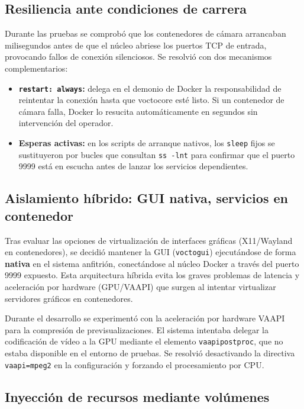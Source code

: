 \subsection{Resiliencia ante condiciones de carrera}

Durante las pruebas se comprobó que los contenedores de cámara arrancaban
milisegundos antes de que el núcleo abriese los puertos TCP de entrada,
provocando fallos de conexión silenciosos. Se resolvió con dos mecanismos
complementarios:

\begin{itemize}
  \item \textbf{\texttt{restart: always}:} delega en el demonio de Docker la
        responsabilidad de reintentar la conexión hasta que voctocore esté listo.
        Si un contenedor de cámara falla, Docker lo resucita automáticamente en
        segundos sin intervención del operador.
  \item \textbf{Esperas activas:} en los scripts de arranque nativos, los
        \texttt{sleep} fijos se sustituyeron por bucles que consultan
        \texttt{ss -lnt} para confirmar que el puerto 9999 está en escucha antes
        de lanzar los servicios dependientes.
\end{itemize}

\subsection{Aislamiento híbrido: GUI nativa, servicios en contenedor}

Tras evaluar las opciones de virtualización de interfaces gráficas (X11/Wayland
en contenedores), se decidió mantener la GUI (\texttt{voctogui}) ejecutándose
de forma \textbf{nativa} en el sistema anfitrión, conectándose al núcleo Docker
a través del puerto 9999 expuesto. Esta arquitectura híbrida evita los graves
problemas de latencia y aceleración por hardware (GPU/VAAPI) que surgen al
intentar virtualizar servidores gráficos en contenedores.

Durante el desarrollo se experimentó con la aceleración por hardware VAAPI para
la compresión de previsualizaciones. El sistema intentaba delegar la codificación
de vídeo a la GPU mediante el elemento \texttt{vaapipostproc}, que no estaba
disponible en el entorno de pruebas. Se resolvió desactivando la directiva
\texttt{vaapi=mpeg2} en la configuración y forzando el procesamiento por CPU.

\subsection{Inyección de recursos mediante volúmenes}

